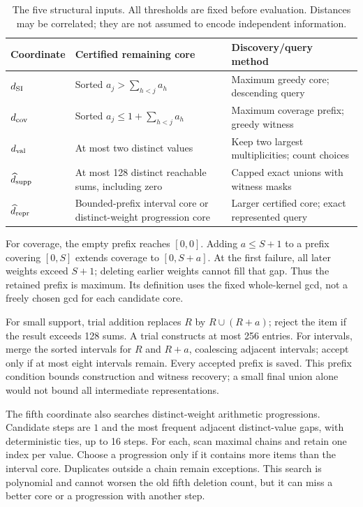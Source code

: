 \documentclass[10pt,english]{article}
\begin{document}
\begin{table}[htbp]
\centering\small
\begin{tabular}{@{}>{\raggedright\arraybackslash}p{.16\linewidth}
  >{\raggedright\arraybackslash}p{.42\linewidth}
  >{\raggedright\arraybackslash}p{.29\linewidth}@{}}
\toprule
Coordinate & Certified remaining core & Discovery/query method\\
\midrule
\(d_{\rm SI}\) & Sorted \(a_j>\sum_{h<j}a_h\) & Maximum greedy core; descending query\\
\(d_{\rm cov}\) & Sorted \(a_j\le1+\sum_{h<j}a_h\) & Maximum coverage prefix; greedy witness\\
\(d_{\rm val}\) & At most two distinct values & Keep two largest multiplicities; count choices\\
\(\widehat d_{\rm supp}\) & At most 128 distinct reachable sums, including zero & Capped exact unions with witness masks\\
\(\widehat d_{\rm repr}\) & Bounded-prefix interval core or distinct-weight progression core & Larger certified core; exact represented query\\
\bottomrule
\end{tabular}
\caption{The five structural inputs. All thresholds are fixed before evaluation. Distances may be correlated; they are not assumed to encode independent information.}
\end{table}

For coverage, the empty prefix reaches \([0,0]\). Adding \(a\le S+1\) to a prefix covering \([0,S]\) extends coverage to \([0,S+a]\). At the first failure, all later weights exceed \(S+1\); deleting earlier weights cannot fill that gap. Thus the retained prefix is maximum. Its definition uses the fixed whole-kernel gcd, not a freely chosen gcd for each candidate core.

For small support, trial addition replaces \(R\) by \(R\cup(R+a)\); reject the item if the result exceeds 128 sums. A trial constructs at most 256 entries. For intervals, merge the sorted intervals for \(R\) and \(R+a\), coalescing adjacent intervals; accept only if at most eight intervals remain. Every accepted prefix is saved. This prefix condition bounds construction and witness recovery; a small final union alone would not bound all intermediate representations.

The fifth coordinate also searches distinct-weight arithmetic progressions. Candidate steps are \(1\) and the most frequent adjacent distinct-value gaps, with deterministic ties, up to 16 steps. For each, scan maximal chains and retain one index per value. Choose a progression only if it contains more items than the interval core. Duplicates outside a chain remain exceptions. This search is polynomial and cannot worsen the old fifth deletion count, but it can miss a better core or a progression with another step.
\end{document}
